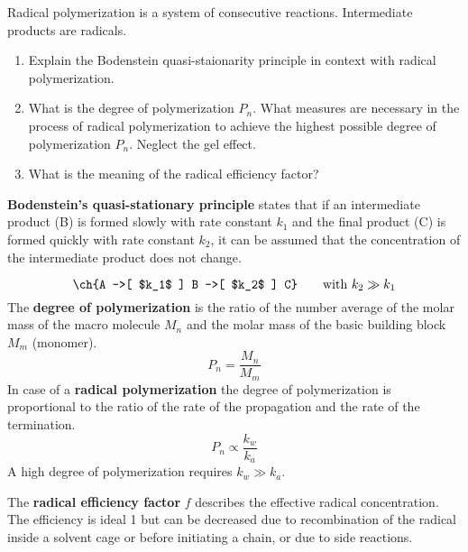
\begin{question}
Radical polymerization is a system of consecutive reactions. Intermediate products are radicals.

\renewcommand{\labelenumi}{(\alph{enumi})}
\begin{enumerate}
 \item Explain the Bodenstein quasi-staionarity principle in context with radical polymerization.
 \item What is the degree of polymerization $P_n$. What measures are necessary in the process of radical polymerization to achieve the highest possible degree of polymerization $P_n$. Neglect the gel effect.
 \item What is the meaning of the radical efficiency factor?
\end{enumerate}
\end{question}

\begin{solution}
\textbf{Bodenstein's quasi-stationary principle} states that if an intermediate product (B) is formed slowly with rate constant $k_1$ and the final product (C) is formed quickly with rate constant $k_2$, it can be assumed that the concentration of the intermediate product does not change.

\begin{equation}
 \ch{A ->[ $k_1$ ] B ->[ $k_2$ ] C} \qquad \text{with } k_2 \gg k_1 
\end{equation}
The \textbf{degree of polymerization} is the ratio of the number average of the molar mass of the macro molecule $M_n$ and the molar mass of the basic building block $M_m$ (monomer).
\begin{equation}
 P_n = \frac{M_n}{M_m}
\end{equation}
In case of a \textbf{radical polymerization} the degree of polymerization is proportional to the ratio of the rate of the propagation and the rate of the termination.
\begin{equation}
 P_n \propto \frac{k_w}{k_a}
\end{equation}
%
A high degree of polymerization requires $k_w \gg k_a$.

The \textbf{radical efficiency factor} $f$ describes the effective radical concentration. The efficiency is ideal 1 but can be decreased due to recombination of the radical inside a solvent cage or before initiating a chain, or due to side reactions. 
\end{solution}
